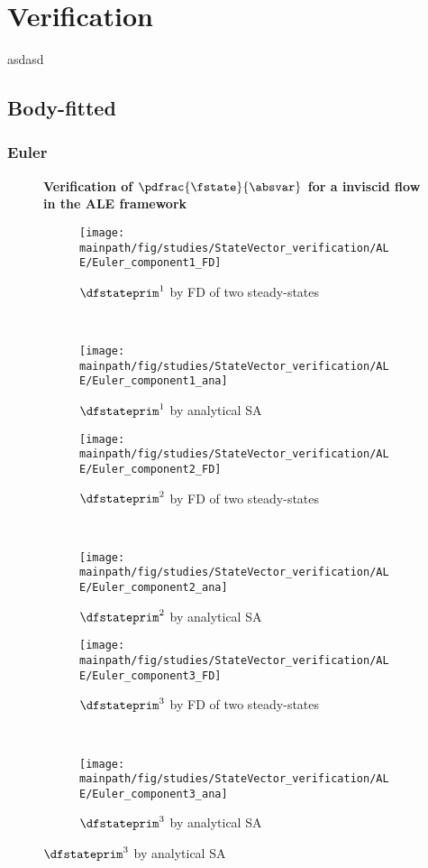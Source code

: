\documentclass[../main.tex]{subfiles}
\begin{document}
\setlength{\delimitershortfall}{0pt}

\section{Verification}
asdasd

\subsection{Body-fitted}

\subsubsection{Euler}
\begin{figure}[t!]
    \centering

    \textbf{Verification of $\pdfrac{\fstate}{\absvar}$ for a inviscid flow in the ALE framework}\par\medskip    
    
    \begin{subfigure}[t]{0.5\textwidth}
        \centering
        \texttt{[image: \\mainpath/fig/studies/StateVector\_verification/ALE/Euler\_component1\_FD]}
        \caption{$\dfstateprim^1$ by \ac{FD} of two steady-states}
    \end{subfigure}%
    ~ 
    \begin{subfigure}[t]{0.5\textwidth}
        \centering
        \texttt{[image: \\mainpath/fig/studies/StateVector\_verification/ALE/Euler\_component1\_ana]}
        \caption{$\dfstateprim^1$ by analytical \ac{SA}}
    \end{subfigure}
    
    
    \begin{subfigure}[t]{0.5\textwidth}
        \centering
        \texttt{[image: \\mainpath/fig/studies/StateVector\_verification/ALE/Euler\_component2\_FD]}
        \caption{$\dfstateprim^2$ by \ac{FD} of two steady-states}
    \end{subfigure}%
    ~ 
    \begin{subfigure}[t]{0.5\textwidth}
        \centering
        \texttt{[image: \\mainpath/fig/studies/StateVector\_verification/ALE/Euler\_component2\_ana]}
        \caption{$\dfstateprim^2$ by analytical \ac{SA}}
    \end{subfigure}
    
    
    \begin{subfigure}[t]{0.5\textwidth}
        \centering
        \texttt{[image: \\mainpath/fig/studies/StateVector\_verification/ALE/Euler\_component3\_FD]}
        \caption{$\dfstateprim^3$ by \ac{FD} of two steady-states}
    \end{subfigure}%
    ~ 
    \begin{subfigure}[t]{0.5\textwidth}
        \centering
        \texttt{[image: \\mainpath/fig/studies/StateVector\_verification/ALE/Euler\_component3\_ana]}
        \caption{$\dfstateprim^3$ by analytical \ac{SA}}
    \end{subfigure}
    

\end{figure}
\end{document}
